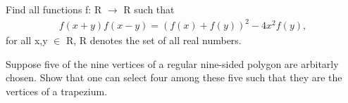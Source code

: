 \item Find all functions f: R $\to$ R such that
\begin{align*}
f(x + y)f(x - y) = (f(x) + f(y))^{2} - 4x^{2}f(y),
\end{align*}
for all x,y $\in$ R, R denotes the set of all real numbers.

\item Suppose five of the nine vertices of a regular nine-sided polygon are arbitarly chosen. Show that one can select four among these five such that they are the vertices of a trapezium.
 







